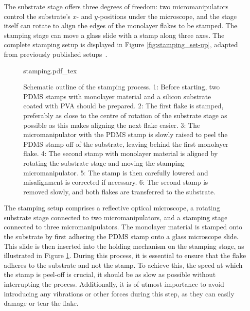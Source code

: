The substrate stage offers three degrees of freedom: two micromanipulators control the substrate's $x$- and $y$-positions under the microscope, and the stage itself can rotate to align the edges of the monolayer flakes to be stamped.
%
The stamping stage can move a glass slide with a stamp along three axes.
%
The complete stamping setup is displayed in Figure \ref{fig:stamping_set-up}, adapted  from previously published setups~\cite{castellanos-gomezDeterministicTransferTwodimensional2014, castellanos-gomezDeterministicTransferTwodimensional2014a}.

\begin{figure}[h]
	\centering
	\def\svgwidth{1\linewidth}
	{stamping.pdf_tex}
	\caption{Schematic outline of the stamping process. 1: Before starting, two PDMS stamps with monolayer material and a silicon substrate coated with PVA should be prepared. 2: The first flake is stamped, preferably as close to the centre of rotation of the substrate stage as possible as this makes aligning the next flake easier. 3: The micromanipulator with the PDMS stamp is slowly raised to peel the PDMS stamp off of the substrate, leaving behind the first monolayer flake. 4: The second stamp with monolayer material is aligned by rotating the substrate stage and moving the stamping micromanipulator. 5: The stamp is then carefully lowered and misalignment is corrected if necessary. 6: The second stamp is removed slowly, and both flakes are transferred to the substrate.}
	\label{fig:stamping_process}
\end{figure}

The stamping setup comprises a reflective optical microscope, a rotating substrate stage connected to two micromanipulators, and a stamping stage connected to three micromanipulators.
%
The monolayer material is stamped onto the substrate by first adhering the PDMS stamp onto a glass microscope slide.
%
This slide is then inserted into the holding mechanism on the stamping stage, as illustrated in Figure \ref{fig:stamping_process}.
%
During this process, it is essential to ensure that the flake adheres to the substrate and not the stamp.
%
To achieve this, the speed at which the stamp is peel-off is crucial, it should be as slow as possible without interrupting the process.
%
Additionally, it is of utmost importance to avoid introducing any vibrations or other forces during this step, as they can easily damage or tear the flake.

